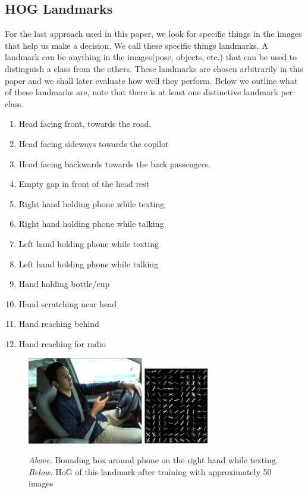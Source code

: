 \documentclass[10pt,twocolumn,letterpaper]{article}
\begin{document}
\subsection{HOG Landmarks}

For the last approach used in this paper, we look for specific things in the images that help us make a decision. We call these specific things landmarks. A landmark can be anything in the images(pose, objects, etc.) that can be used to distinguish a class from the others. These landmarks are chosen arbitrarily in this paper and we shall later evaluate how well they perform. Below we outline what of these landmarks are, note that there is at least one distinctive landmark per class.

\begin{enumerate}
	\item Head facing front, towards the road.
	\item Head facing sideways towards the copilot
	\item Head facing backwards towards the back passengers.
	\item Empty gap in front of the head rest
	\item Right hand holding phone while texting
	\item Right hand holding phone while talking\
	\item Left hand holding phone while texting
	\item Left hand holding phone while talking
	\item Hand holding bottle/cup
	\item Hand scratching near head
	\item Hand reaching behind
	\item Hand reaching for radio	
\end{enumerate}


\begin{figure}[h]
	\centering
	\includegraphics[width=0.45\textwidth]{mult_HOG/HOG_phone_det}\vspace{0.01\textwidth}
	\includegraphics[width=0.25\textwidth]{mult_HOG/HOG_phone}
	\caption{\textit{Above.} Bounding box around phone on the right hand while texting. \textit{Below.} HoG of this landmark after training with approximately 50 images}
	\label{HoG_phone}
\end{figure}
\end{document}
